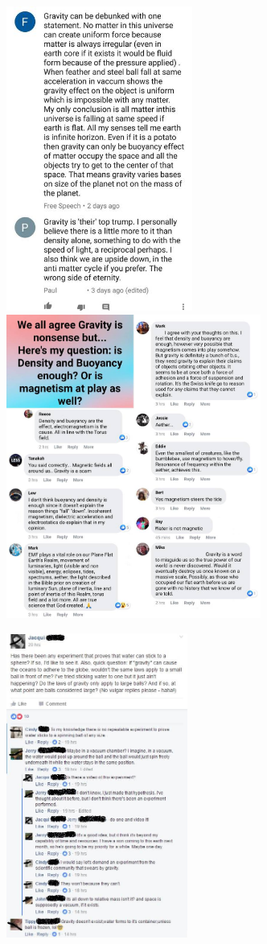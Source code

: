 \includegraphics[height=10cm]{images/gravity_stupid/stupid9}
\includegraphics[height=10cm]{images/gravity_stupid/stupid10}

\includegraphics[height=10cm]{images/gravity_stupid/stupid11}
